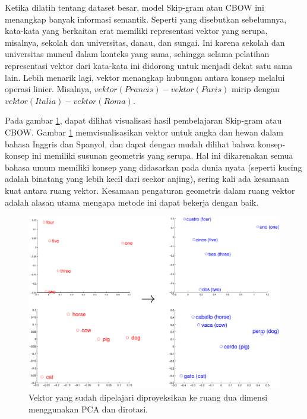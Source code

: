    Ketika dilatih tentang dataset besar, model Skip-gram atau CBOW ini menangkap banyak informasi semantik. Seperti yang disebutkan sebelumnya, kata-kata yang berkaitan erat memiliki representasi vektor yang serupa, misalnya, sekolah dan universitas, danau, dan sungai. Ini karena sekolah dan universitas muncul dalam konteks yang sama, sehingga selama pelatihan representasi vektor dari kata-kata ini didorong untuk menjadi dekat satu sama lain. Lebih menarik lagi, vektor menangkap hubungan antara konsep melalui operasi linier. Misalnya, \(vektor(Prancis) - vektor(Paris)\) mirip dengan \(vektor(Italia) - vektor(Roma)\).

    Pada gambar \ref{fig:ilustrasi_embedding_inggris_spanyol}, dapat dilihat visualisasi hasil pembelajaran Skip-gram atau CBOW. Gambar \ref{fig:ilustrasi_embedding_inggris_spanyol} memvisualisasikan vektor untuk angka dan hewan dalam bahasa Inggris dan Spanyol, dan dapat dengan mudah dilihat bahwa konsep-konsep ini memiliki susunan geometris yang serupa. Hal ini dikarenakan semua bahasa umum memiliki konsep yang didasarkan pada dunia nyata (seperti kucing adalah binatang yang lebih kecil dari seekor anjing), sering kali ada kesamaan kuat antara ruang vektor. Kesamaan pengaturan geometris dalam ruang vektor adalah alasan utama mengapa metode ini dapat bekerja dengan baik.

    \begin{figure}[ht]
        \centering
        \includegraphics[width=1\textwidth]{resources/ilustration-eng-spn-word.png}
        \caption[Ilustrasi ruang \textit{embedding} antara bahasa Inggris dan Spanyol \parencite{MikolovExploiting}.]{ Vektor yang sudah dipelajari diproyeksikan ke ruang dua dimensi menggunakan PCA dan dirotasi.}
        \label{fig:ilustrasi_embedding_inggris_spanyol}
    \end{figure}

